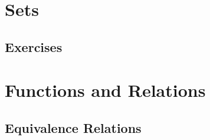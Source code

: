 

\section{Sets}


\subsection{Exercises}


\section{Functions and Relations}


\subsection{Equivalence Relations}
